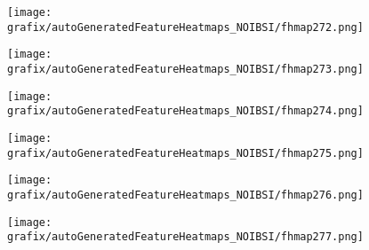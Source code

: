 \hspace{\hsp} 
\begin{subfigure}{\wid\textwidth} 
    \centering 
    \caption{\tiny \sffamily {}} 
    \vspace{\vsp} 
    \texttt{[image: grafix/autoGeneratedFeatureHeatmaps\_NOIBSI/fhmap272.png]} 
\end{subfigure} 
\hspace{\hsp} 
\begin{subfigure}{\wid\textwidth} 
    \centering 
    \caption{\tiny \sffamily {}} 
    \vspace{\vsp} 
    \texttt{[image: grafix/autoGeneratedFeatureHeatmaps\_NOIBSI/fhmap273.png]} 
\end{subfigure} 
\hspace{\hsp} 
\begin{subfigure}{\wid\textwidth} 
    \centering 
    \caption{\tiny \sffamily {}} 
    \vspace{\vsp} 
    \texttt{[image: grafix/autoGeneratedFeatureHeatmaps\_NOIBSI/fhmap274.png]} 
\end{subfigure} 
\hspace{\hsp} 
\begin{subfigure}{\wid\textwidth} 
    \centering 
    \caption{\tiny \sffamily {}} 
    \vspace{\vsp} 
    \texttt{[image: grafix/autoGeneratedFeatureHeatmaps\_NOIBSI/fhmap275.png]} 
\end{subfigure} 
\hspace{\hsp} 
\begin{subfigure}{\wid\textwidth} 
    \centering 
    \caption{\tiny \sffamily {}} 
    \vspace{\vsp} 
    \texttt{[image: grafix/autoGeneratedFeatureHeatmaps\_NOIBSI/fhmap276.png]} 
\end{subfigure} 
\hspace{\hsp} 
\begin{subfigure}{\wid\textwidth} 
    \centering 
    \caption{\tiny \sffamily {}} 
    \vspace{\vsp} 
    \texttt{[image: grafix/autoGeneratedFeatureHeatmaps\_NOIBSI/fhmap277.png]} 
\end{subfigure} 
\hspace{\hsp} 
